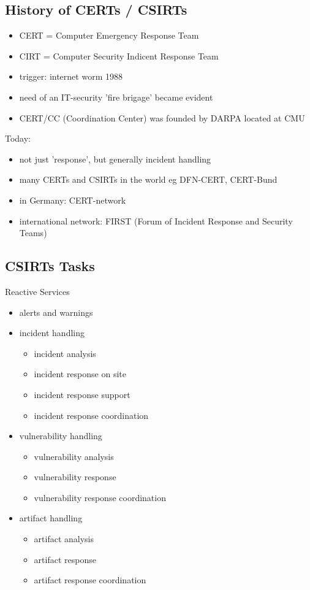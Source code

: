 \documentclass[11pt]{article}
\begin{document}
\subsection{History of CERTs / CSIRTs}
\label{sec:org1224f4a}
\begin{itemize}
\item CERT = Computer Emergency Response Team
\item CIRT = Computer Security Indicent Response Team

\item trigger: internet worm 1988
\item need of an IT-security 'fire brigage' became evident
\item CERT/CC (Coordination Center) was founded by DARPA located at CMU
\end{itemize}

Today:
\begin{itemize}
\item not just 'response', but generally incident handling
\item many CERTs and CSIRTs in the world eg DFN-CERT, CERT-Bund
\item in Germany: CERT-network
\item international network: FIRST (Forum of Incident Response and Security Teams)
\end{itemize}

\subsection{CSIRTs Tasks}
\label{sec:orgba47e2a}
Reactive Services
\begin{itemize}
\item alerts and warnings
\item incident handling
\begin{itemize}
\item incident analysis
\item incident response on site
\item incident response support
\item incident response coordination
\end{itemize}
\item vulnerability handling
\begin{itemize}
\item vulnerability analysis
\item vulnerability response
\item vulnerability response coordination
\end{itemize}
\item artifact handling
\begin{itemize}
\item artifact analysis
\item artifact response
\item artifact response coordination
\end{itemize}
\end{itemize}
\end{document}
